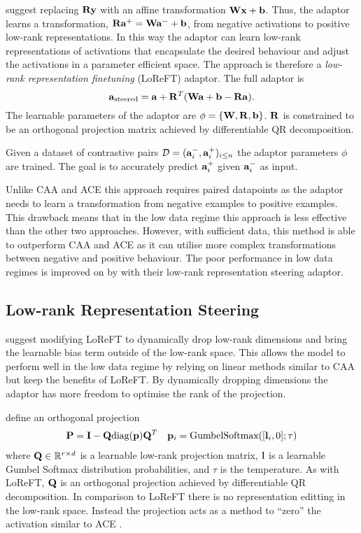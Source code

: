 \citet{reft} suggest replacing $\mathbf{R}\mathbf{y}$ with an affine transformation $\mathbf{W}\mathbf{x} + \mathbf{b}$.
Thus, the adaptor learns a transformation, $\mathbf{R}\mathbf{a}^+ = \mathbf{W}\mathbf{a}^- + \mathbf{b}$, from negative activations to positive low-rank representations.
In this way the adaptor can learn low-rank representations of activations that encapsulate the desired behaviour and adjust the activations in a parameter efficient space.
The approach is therefore a \textit{low-rank representation finetuning} (LoReFT) adaptor.
The full adaptor is
\begin{equation}
    \label{eq:loreft}
    \mathbf{a}_\text{steered} = \mathbf{a} + \mathbf{R}^T(\mathbf{W}\mathbf{a} + \mathbf{b} - \mathbf{R}\mathbf{a}).
\end{equation}
The learnable parameters of the adaptor are $\phi = \{\mathbf{W}, \mathbf{R}, \mathbf{b}\}$.
$\mathbf{R}$ is constrained to be an orthogonal projection matrix achieved by differentiable QR decomposition.

Given a dataset of contrastive pairs $\mathcal{D} = (\mathbf{a}_i^-, \mathbf{a}_i^+)_{i\le n}$ the adaptor parameters $\phi$ are trained.
The goal is to accurately predict $\mathbf{a}_i^+$ given $\mathbf{a}_i^-$ as input.

Unlike CAA \citep{caa} and ACE \citep{ace} this approach requires paired datapoints as the adaptor needs to learn a transformation from negative examples to positive examples.
This drawback means that in the low data regime this approach is less effective than the other two approaches.
However, with sufficient data, this method is able to outperform CAA and ACE as it can utilise more complex transformations between negative and positive behaviour.
The poor performance in low data regimes is improved on by \citet{steering-clear} with their low-rank representation steering adaptor.

\subsection{Low-rank Representation Steering}
\label{lorest}

\citet{steering-clear} suggest modifying LoReFT \citep{reft} to dynamically drop low-rank dimensions and bring the learnable bias term outside of the low-rank space.
This allows the model to perform well in the low data regime by relying on linear methods similar to CAA \citep{caa} but keep the benefits of LoReFT.
By dynamically dropping dimensions the adaptor has more freedom to optimise the rank of the projection.

\citet{steering-clear} define an orthogonal projection
\begin{align*}
    \mathbf{P} = \mathbf{I} - \mathbf{Q}\text{diag}(\mathbf{p})\mathbf{Q}^T && \mathbf{p}_i = \text{GumbelSoftmax}([\mathbf{l}_i,0];\tau)
\end{align*}
where $\mathbf{Q} \in \mathbb{R}^{r\times d}$ is a learnable low-rank projection matrix, $\mathbf{l}$ is a learnable Gumbel Softmax distribution probabilities, and $\tau$ is the temperature.
As with LoReFT, $\mathbf{Q}$ is an orthogonal projection achieved by differentiable QR decomposition.
In comparison to LoReFT  there is no representation editting in the low-rank space.
Instead the projection acts as a method to ``zero'' the activation similar to ACE \citep{ace}.

